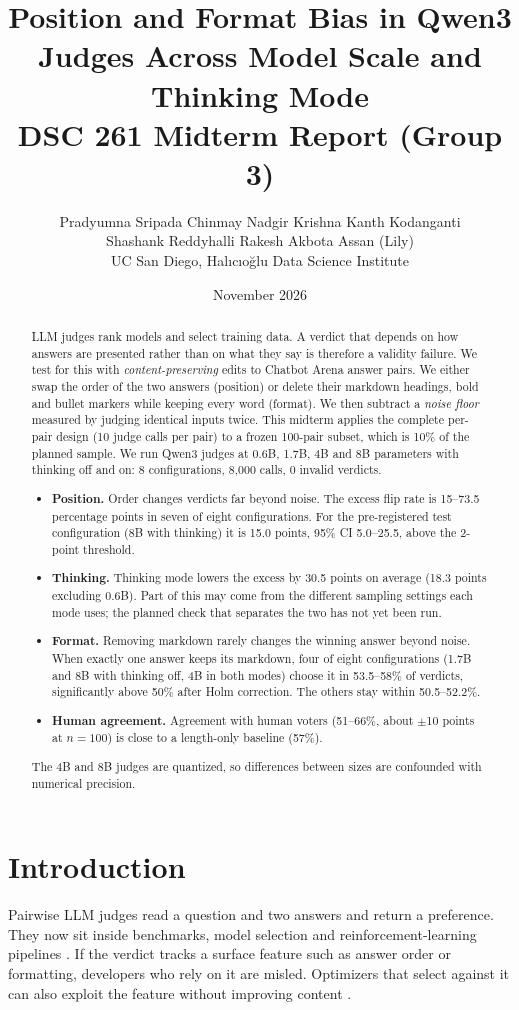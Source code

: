 \documentclass[10pt]{article}
\title{\textbf{Position and Format Bias in Qwen3 Judges Across Model Scale and Thinking Mode}\\[0.3em]
\large DSC 261 Midterm Report (Group 3)}
\author{Pradyumna Sripada \quad Chinmay Nadgir \quad Krishna Kanth Kodanganti\\
Shashank Reddyhalli Rakesh \quad Akbota Assan (Lily)\\
\small UC San Diego, Hal\i c\i o\u{g}lu Data Science Institute}
\date{November 2026}
\begin{document}
\maketitle

\begin{abstract}
LLM judges rank models and select training data. A verdict that depends on how answers are presented rather than
on what they say is therefore a validity failure. We test for this with \emph{content-preserving} edits to Chatbot
Arena answer pairs. We either swap the order of the two answers (position) or delete their markdown headings, bold
and bullet markers while keeping every word (format). We then subtract a \emph{noise floor} measured by judging
identical inputs twice. This midterm applies the complete per-pair design (10 judge calls per pair) to a frozen
100-pair subset, which is 10\% of the planned sample. We run Qwen3 judges at 0.6B, 1.7B, 4B and 8B parameters with
thinking off and on: 8 configurations, 8{,}000 calls, 0 invalid verdicts.
\begin{itemize}
\item \textbf{Position.} Order changes verdicts far beyond noise. The excess flip rate is 15--73.5 percentage
points in seven of eight configurations. For the pre-registered test configuration (8B with thinking) it is 15.0
points, 95\% CI 5.0--25.5, above the 2-point threshold.
\item \textbf{Thinking.} Thinking mode lowers the excess by 30.5 points on average (18.3 points excluding 0.6B).
Part of this may come from the different sampling settings each mode uses; the planned check that separates
the two has not yet been run.
\item \textbf{Format.} Removing markdown rarely changes the winning answer beyond noise. When exactly one answer
keeps its markdown, four of eight configurations (1.7B and 8B with thinking off, 4B in both modes) choose it in
53.5--58\% of verdicts, significantly above 50\% after Holm correction. The others stay within 50.5--52.2\%.
\item \textbf{Human agreement.} Agreement with human voters (51--66\%, about $\pm$10 points at $n=100$) is close
to a length-only baseline (57\%).
\end{itemize}
The 4B and 8B judges are quantized, so differences between sizes are confounded with numerical precision.
\end{abstract}

\section{Introduction}
Pairwise LLM judges read a question and two answers and return a preference. They now sit inside benchmarks,
model selection and reinforcement-learning pipelines \citep{zheng2023judging}. If the verdict tracks a surface
feature such as answer order or formatting, developers who rely on it are misled. Optimizers that select against
it can also exploit the feature without improving content \citep{zhang2025lists,gao2023scaling,zhou2026selfplay}.
\end{document}
